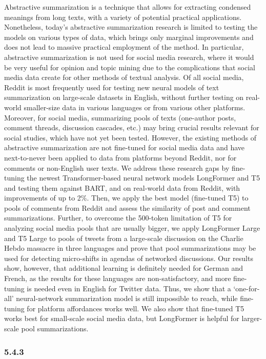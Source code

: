 Abstractive summarization is a technique that allows for extracting condensed meanings from long texts, with a variety of potential practical applications. Nonetheless, today’s abstractive summarization research is limited to testing the models on various types of data, which brings only marginal improvements and does not lead to massive practical employment of the method. In particular, abstractive summarization is not used for social media research, where it would be very useful for opinion and topic mining due to the complications that social media data create for other methods of textual analysis. Of all social media, Reddit is most frequently used for testing new neural models of text summarization on large-scale datasets in English, without further testing on real-world smaller-size data in various languages or from various other platforms. Moreover, for social media, summarizing pools of texts (one-author posts, comment threads, discussion cascades, etc.) may bring crucial results relevant for social studies, which have not yet been tested. However, the existing methods of abstractive summarization are not fine-tuned for social media data and have next-to-never been applied to data from platforms beyond Reddit, nor for comments or non-English user texts. We address these research gaps by fine-tuning the newest Transformer-based neural network models LongFormer and T5 and testing them against BART, and on real-world data from Reddit, with improvements of up to 2\%. Then, we apply the best model (fine-tuned T5) to pools of comments from Reddit and assess the similarity of post and comment summarizations. Further, to overcome the 500-token limitation of T5 for analyzing social media pools that are usually bigger, we apply LongFormer Large and T5 Large to pools of tweets from a large-scale discussion on the Charlie Hebdo massacre in three languages and prove that pool summarizations may be used for detecting micro-shifts in agendas of networked discussions. Our results show, however, that additional learning is definitely needed for German and French, as the results for these languages are non-satisfactory, and more fine-tuning is needed even in English for Twitter data. Thus, we show that a ‘one-for-all’ neural-network summarization model is still impossible to reach, while fine-tuning for platform affordances works well. We also show that fine-tuned T5 works best for small-scale social media data, but LongFormer is helpful for larger-scale pool summarizations.

\subsubsection{5.4.3}

